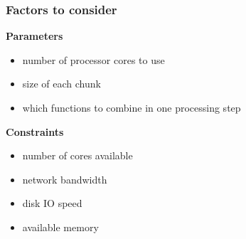 \documentclass{beamer}
\begin{document}
\begin{frame}

    \frametitle{Factors to consider}

\textbf{Parameters}
\begin{itemize}
    \item number of processor cores to use
    \item size of each chunk
    \item which functions to combine in one processing step
\end{itemize}

\textbf{Constraints}
\begin{itemize}
    \item number of cores available
    \item network bandwidth
    \item disk IO speed
    \item available memory
\end{itemize}

%
%
%

%
%
%
%
%
\end{frame}
\end{document}
